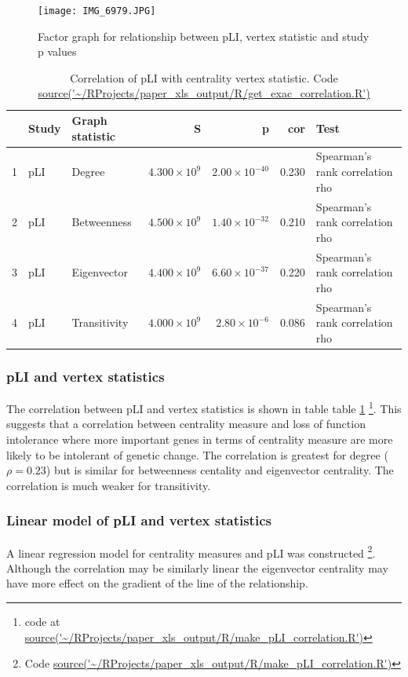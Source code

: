 \begin{figure}
    \centering
    \texttt{[image: IMG\_6979.JPG]}
    \caption{Factor graph for relationship between pLI, vertex statistic and study p values}
    \label{Figure:Factor graph for relationship between pLI, vertex statistic and study p values}
\end{figure}
\begin{table}[ht]
\centering
\begin{tabular}{rllrrrl}
  \hline
 & Study & Graph statistic & S & p & cor & Test \\ 
  \hline
1 & pLI & Degree & $4.300 \times 10^{9}$ & $2.00 \times 10^{-40}$ & 0.230 & Spearman's rank correlation rho \\ 
  2 & pLI & Betweenness & $4.500 \times 10^{9}$ & $1.40 \times 10^{-32}$ & 0.210 & Spearman's rank correlation rho \\ 
  3 & pLI & Eigenvector & $4.400 \times 10^{9}$ & $6.60 \times 10^{-37}$ & 0.220 & Spearman's rank correlation rho \\ 
  4 & pLI & Transitivity & $4.000 \times 10^{9}$ & $2.80 \times 10^{-6}$ & 0.086 & Spearman's rank correlation rho \\ 
   \hline
\end{tabular}
\caption{Correlation of pLI with centrality vertex statistic. Code \url{source('~/RProjects/paper_xls_output/R/get_exac_correlation.R')}} 
\label{Table:Correlation of pLI with centrality vertex statistic}
\end{table}
\subsubsection{pLI and vertex statistics}
 The   correlation between pLI and vertex statistics is shown in table table \ref{Table:Correlation of pLI with centrality vertex statistic} \footnote{ code at \url{source('~/RProjects/paper_xls_output/R/make_pLI_correlation.R')}}. This suggests that a correlation between centrality measure and loss of function intolerance where more important genes in terms of centrality measure are more likely to be intolerant of genetic change. The correlation is greatest for degree ($\rho = 0.23$) but is similar for betweenness centality and eigenvector centrality. The correlation is much weaker for transitivity. 
 
 
\subsubsection{Linear model of pLI and vertex statistics}    
A linear regression model for centrality measures and pLI was constructed \footnote{Code \url{source('~/RProjects/paper_xls_output/R/make_pLI_correlation.R')}}. Although the correlation may be similarly linear the eigenvector centrality may have more effect on the gradient of the line of the relationship. 

